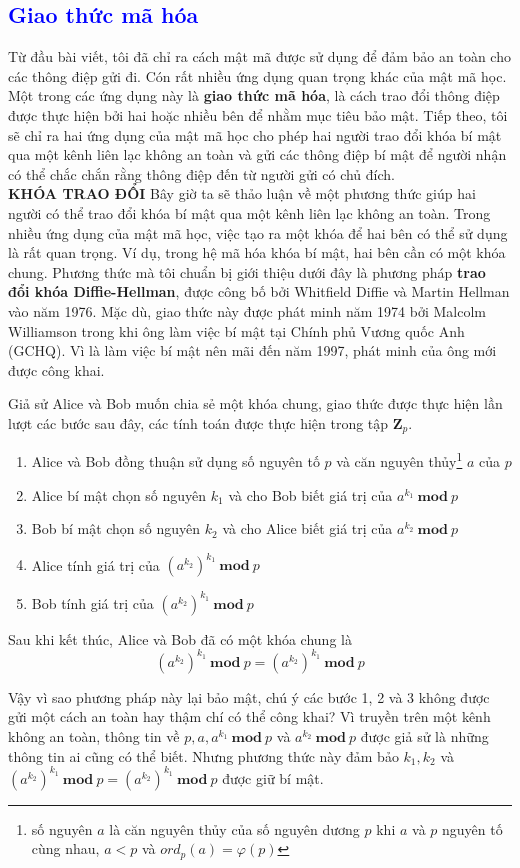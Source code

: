 \textcolor{blue}{\section{Giao thức mã hóa}}
Từ đầu bài viết, tôi đã chỉ ra cách mật mã được sử dụng để đảm bảo an
toàn cho các thông điệp gửi đi. Cón rất nhiều ứng dụng quan trọng khác của
mật mã học. Một trong các ứng dụng này là \textbf{giao thức mã hóa}, là cách trao đổi
thông điệp được thực hiện bởi hai hoặc nhiều bên để nhằm mục tiêu bảo
mật. Tiếp theo, tôi sẽ chỉ ra hai ứng dụng của mật mã học cho
phép hai người trao đổi khóa bí mật qua một kênh liên lạc không an toàn
và gửi các thông điệp bí mật để người nhận có thể chắc chắn rằng thông điệp đến từ người gửi có chủ đích. \\

\noindent \textcolor{Mycolor}{\textbf{KHÓA TRAO ĐỔI}} Bây giờ ta sẽ thảo luận về một phương thức giúp hai người có thể trao đổi khóa bí mật qua một kênh liên lạc không an toàn.
Trong nhiều ứng dụng của mật mã học, việc tạo ra một khóa để hai bên có thể sử dụng là rất quan trọng. Ví dụ, trong hệ mã hóa khóa bí mật, hai bên cần có một khóa chung.
Phương thức mà tôi chuẩn bị giới thiệu dưới đây là phương pháp \textbf{trao đổi khóa Diffie-Hellman}, được công bố bởi Whitfield Diffie và Martin Hellman vào năm 1976.
Mặc dù, giao thức này được phát minh năm 1974 bởi Malcolm Williamson
trong khi ông làm việc bí mật tại Chính phủ Vương quốc Anh (GCHQ). Vì là làm việc bí mật nên mãi đến năm 1997, phát minh của ông mới
được công khai.

Giả sử Alice và Bob muốn chia sẻ một khóa chung, giao thức được thực hiện lần lượt các bước sau đây, các tính toán được thực hiện trong tập $\mathbf{Z}_p$. \\
\begin{enumerate}[label=\arabic*)]
    \item Alice và Bob đồng thuận sử dụng số nguyên tố $p$ và căn nguyên thủy\footnote{số nguyên $a$ là căn nguyên thủy của số nguyên dương $p$ khi $a$ và $p$ nguyên tố cùng nhau, $a<p$ và \mbox{$ord_{p}(a)=\varphi(p)$}} $a$ của $p$
    \item Alice bí mật chọn số nguyên $k_1$ và cho Bob biết giá trị của $a^{k_1}\ \mathbf{mod}\ p$
    \item Bob bí mật chọn số nguyên $k_2$ và cho Alice biết giá trị của $a^{k_2}\ \mathbf{mod}\ p$
    \item Alice tính giá trị của $(a^{k_2})^{k_1}\ \mathbf{mod}\ p$
    \item Bob tính giá trị của $(a^{k_2})^{k_1}\ \mathbf{mod}\ p$
\end{enumerate}
Sau khi kết thúc, Alice và Bob đã có một khóa chung là
$$(a^{k_2})^{k_1}\ \mathbf{mod}\ p = (a^{k_2})^{k_1}\ \mathbf{mod}\ p$$

Vậy vì sao phương pháp này lại bảo mật, chú ý các bước 1, 2 và 3 không được gửi một cách an toàn hay thậm chí có thể công khai?
Vì truyền trên một kênh không an toàn, thông tin về $p, a, a^{k_1}\ \mathbf{mod}\ p$ và $a^{k_2}\ \mathbf{mod}\ p$ được giả sử là những thông tin ai cũng có thể biết.
Nhưng phương thức này đảm bảo $k_1,k_2$ và $(a^{k_2})^{k_1}\ \mathbf{mod}\ p = (a^{k_2})^{k_1}\ \mathbf{mod}\ p$ được giữ bí mật.
